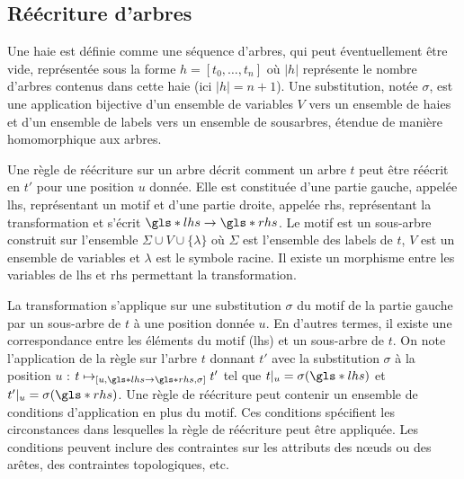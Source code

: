 \subsection{Réécriture d'arbres}
\label{sec:struct:pre:tree-rewritting}

\begin{definition}[Haie]
    Une haie est définie comme une séquence d'arbres, qui peut éventuellement être vide, représentée sous la forme $h = [t_0, \dots , t_n]$ où $|h|$ représente le nombre d'arbres contenus dans cette haie (ici $|h| = n + 1$).
    Une substitution, notée $\sigma$, est une application bijective d'un ensemble de variables $V$ vers un ensemble de haies et d'un ensemble de labels vers un ensemble de sousarbres, étendue de manière homomorphique aux arbres.
\end{definition}

\begin{definition}
    Une règle de réécriture sur un arbre décrit comment un arbre $t$ peut être réécrit en $t'$ pour une position $u$ donnée.
    Elle est constituée d'une partie gauche, appelée \gls{lhs}, représentant un motif et d'une partie droite, appelée \gls{rhs}, représentant la transformation et s'écrit $\gls*{lhs} \to \gls*{rhs}$.
    Le motif est un sous-arbre construit sur l'ensemble $\Sigma \cup V \cup \{\lambda\}$ où $\Sigma$ est l'ensemble des labels de $t$, $V$ est un ensemble de variables et $\lambda$ est le symbole racine.
    Il existe un morphisme entre les variables de \gls{lhs} et \gls{rhs} permettant la transformation.

    La transformation s'applique sur une substitution $\sigma$ du motif de la partie gauche par un sous-arbre de $t$ à une position donnée $u$.
    En d'autres termes, il existe une correspondance entre les éléments du motif (\gls{lhs}) et un sous-arbre de $t$.
    On note l'application de la règle sur l'arbre $t$ donnant $t'$ avec la substitution $\sigma$ à la position $u$ : $t \mapsto_{[u, \gls*{lhs} \to \gls*{rhs}, \sigma]} t'$ tel que $t|_u = \sigma(\gls*{lhs})$ et $t'|_u = \sigma(\gls*{rhs})$.
    Une règle de réécriture peut contenir un ensemble de conditions d'application en plus du motif.
    Ces conditions spécifient les circonstances dans lesquelles la règle de réécriture peut être appliquée.
    Les conditions peuvent inclure des contraintes sur les attributs des nœuds ou des arêtes, des contraintes topologiques, etc.
\end{definition}

